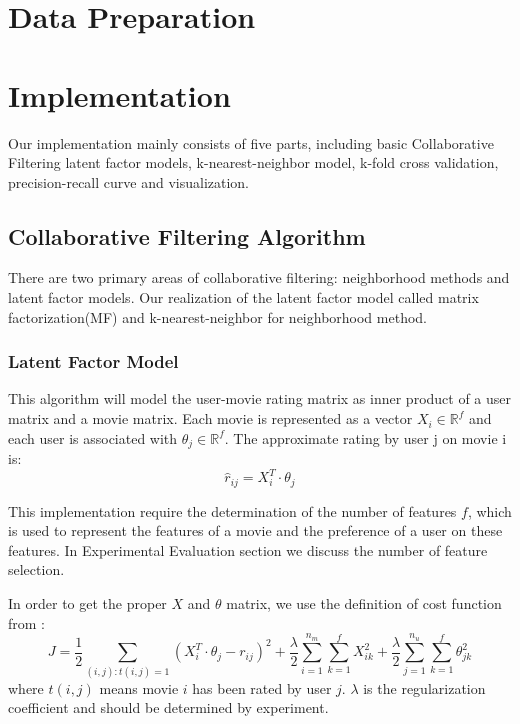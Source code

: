 \documentclass[12pt]{article}
\begin{document}


\section{Data Preparation}

\section{Implementation}

Our implementation mainly consists of five parts, including basic Collaborative Filtering latent factor models, k-nearest-neighbor model, k-fold cross validation, precision-recall curve and visualization.

\subsection{Collaborative Filtering Algorithm}

There are two primary areas of collaborative filtering: neighborhood methods and latent factor models\cite{MF}. Our realization of the latent factor model called matrix factorization(MF) and k-nearest-neighbor for neighborhood method.

\subsubsection{Latent Factor Model}
This algorithm will model the user-movie rating matrix as inner product of a user matrix and a movie matrix. Each movie is represented as a vector $X_i \in \mathbb{R}^f$ and each user is associated with $\theta_j \in \mathbb{R}^f$. The approximate rating by user j on movie i is:
$$\hat{r}_{ij} = X_i^T \cdot \theta_j$$

This implementation require the determination of the number of features $f$, which is used to represent the features of a movie and the preference of a user on these features. In Experimental Evaluation section we discuss the number of feature selection.

In order to get the proper $X$ and $\theta$ matrix, we use the definition of cost function from \cite{MF}:
$$J = \frac{1}{2}\sum_{(i,j):t(i,j)=1}(X_i^T \cdot \theta_j - r_{ij})^2+\frac{\lambda}{2}\sum_{i = 1}^{n_m}\sum_{k = 1}^{f}X_{ik}^{2}+\frac{\lambda}{2}\sum_{j = 1}^{n_u}\sum_{k = 1}^{f}\theta_{jk}^{2}$$
where $t(i,j)$ means movie $i$ has been rated by user $j$. $\lambda$ is the regularization coefficient and should be determined by experiment.
\end{document}
